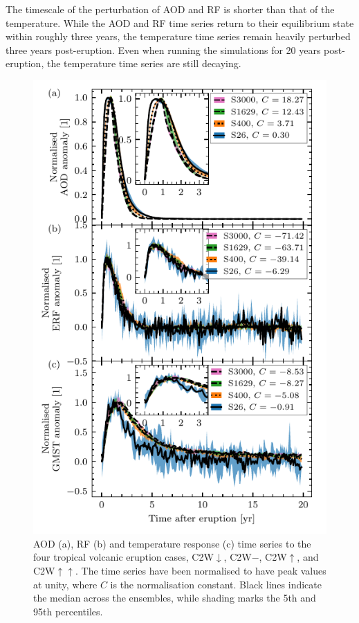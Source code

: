 \documentclass[draft]{agujournal2019}
\begin{document}
  The timescale of the perturbation of AOD and RF is shorter than that of the
  temperature. While the AOD and RF time series return to their equilibrium state within
  roughly three years, the temperature time series remain heavily perturbed three years
  post-eruption. Even when running the simulations for 20 years post-eruption, the
  temperature time series are still decaying.

  \begin{figure}
    \centering \includegraphics{figure1}

    \caption{AOD (a), RF (b) and temperature response (c) time series to the four
      tropical volcanic eruption cases, C2W\(\downarrow\), C2W\(-\), C2W\(\uparrow\),
      and C2W\(\uparrow\uparrow\). The time series have been normalised to have peak
      values at unity, where \(C\) is the normalisation constant. Black lines indicate
      the median across the ensembles, while shading marks the 5th and 95th
      percentiles.}\label{fig:1_compare_waveform}%
  \end{figure}
\end{document}
